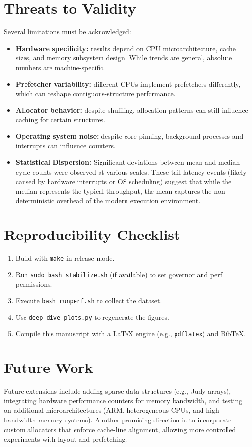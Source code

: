 \documentclass[11pt]{article}
\begin{document}
\section{Threats to Validity}
Several limitations must be acknowledged:
\begin{itemize}
    \item \textbf{Hardware specificity:} results depend on CPU microarchitecture, cache sizes, and memory subsystem design. While trends are general, absolute numbers are machine-specific.
    \item \textbf{Prefetcher variability:} different CPUs implement prefetchers differently, which can reshape contiguous-structure performance.
    \item \textbf{Allocator behavior:} despite shuffling, allocation patterns can still influence caching for certain structures.
    \item \textbf{Operating system noise:} despite core pinning, background processes and interrupts can influence counters.
    \item \textbf{Statistical Dispersion:} Significant deviations between mean and median cycle counts were observed at various scales. These tail-latency events (likely caused by hardware interrupts or OS scheduling) suggest that while the median represents the typical throughput, the mean captures the non-deterministic overhead of the modern execution environment.
\end{itemize}

\section{Reproducibility Checklist}
\begin{enumerate}
    \item Build with \texttt{make} in release mode.
    \item Run \texttt{sudo bash stabilize.sh} (if available) to set governor and perf permissions.
    \item Execute \texttt{bash runperf.sh} to collect the dataset.
    \item Use \texttt{deep\_dive\_plots.py} to regenerate the figures.
    \item Compile this manuscript with a LaTeX engine (e.g., \texttt{pdflatex}) and BibTeX.
\end{enumerate}

\section{Future Work}
Future extensions include adding sparse data structures (e.g., Judy arrays), integrating hardware performance counters for memory bandwidth, and testing on additional microarchitectures (ARM, heterogeneous CPUs, and high-bandwidth memory systems). Another promising direction is to incorporate custom allocators that enforce cache-line alignment, allowing more controlled experiments with layout and prefetching.
\end{document}
